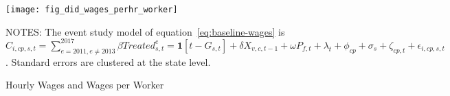 \begin{figure}[H]
    \centering
    \texttt{[image: fig\_did\_wages\_perhr\_worker]}
    \caption{Hourly Wages and Wages per Worker}
    \label{fig:baseline-hourly-wages-and-wages-per-worker}
    \begin{minipage}{12cm}
        \vspace{0.05in}
        NOTES: The event study model of equation~\ref{eq:baseline-wages} is $C_{i,cp,s,t} = \sum_{{e = 2011},{e \neq 2013}}^{2017} \beta Treated_{s,t}^e = \textbf{1}[t - G_{s,t}] + \delta X_{v,c,t-1} + \omega P_{f,t} + \lambda_{t} + \phi_{cp} + \sigma_{s} + \zeta_{cp,t} + \epsilon_{i,cp,s,t}$. Standard errors are clustered at the state level.
    \end{minipage}
\end{figure}